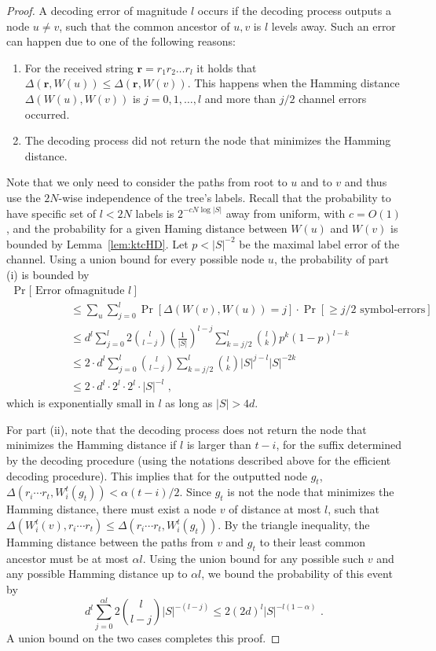 \documentclass[ letterpaper, 11pt]{article}
\begin{document}
\begin{proof}
A decoding error of magnitude $l$ occurs if the decoding process outputs a node
 $u\ne v$, such that the common ancestor of $u,v$ is $l$ levels away.
Such an error can happen due to one of the following reasons:
\begin{enumerate}
\renewcommand{\labelenumi}{(\roman{enumi})}
\setlength{\itemsep}{1pt}
\vspace{-0.3em}
\item For the received string ${\mathbf r}=r_1r_2 \ldots r_l$ it holds that
$\Delta({\mathbf r}, W(u)) \le \Delta({\mathbf r}, W(v))$. This happens when
the Hamming distance $\Delta(W(u),W(v))$ is $j=0,1,\ldots,l$ and more than $j/2$ channel errors  occurred.
\item The decoding process did not return the node that minimizes the Hamming distance.
\end{enumerate}
Note that we only need to consider the paths from root to $u$ and to $v$ and thus use the $2N$-wise independence of the tree's labels.
Recall that the probability to have specific set of $l<2N$ labels is $2^{-cN\log|S|}$ away from uniform, with $c=O(1)$, and the probability for a given Haming distance between $W(u)$ and $W(v)$ is bounded by Lemma~\ref{lem:ktcHD}.
Let $p < |S|^{-2}$ be the maximal label error of the channel.
Using a union bound for every possible node $u$,
the probability of part (i) is bounded by
\begin{align*}
\Pr[ \text{ Error of}&\text{ magnitude } l\ ]  \\ &
\le  \sum_u\sum_{j=0}^l \Pr [\Delta (W(v),W(u)) = j  ] \cdot  \Pr [\ge j/2 \text{ symbol-errors}] \\
& \le d^l \sum_{j=0}^{l}  2{l \choose l-j} \left(\frac{1}{|S|}\right)^{l-j}
   \sum_{k=j/2}^l {l \choose k} p^k (1-p)^{l-k} \\
& \le 2\cdot d^l \sum_{j=0}^{l}  {l \choose l-j} \sum_{k=j/2}^l {l \choose k} {|S|}^{j-l} |S|^{-2k} \\ &
  \le 2\cdot d^l  \cdot 2^l\cdot 2^l\cdot |S|^{-l}\text{ ,}
\end{align*}
which is exponentially small in $l$ as long as $|S|>4d$.


For part (ii),
note that the decoding process does not return the node that minimizes the Hamming
distance if
$l$ is larger than $t-i$, for the suffix determined by the decoding procedure
(using the notations described above for the efficient decoding procedure).
This implies that for the outputted node $g_t$, $\Delta(r_i\cdots r_t,W_i^{t}(g_t)) < \alpha(t-i)/2$.
Since $g_t$ is not the node that minimizes the Hamming distance,
there must exist a node $v$
of distance at most $l$,
such that $\Delta(W_i^t(v), r_i\cdots r_t) \le  \Delta(r_i\cdots r_t,W_i^{t}(g_t))$.
By the triangle inequality, the Hamming distance between the paths from
 $v$ and $g_t$  to
 their least common ancestor
must be at most $\alpha l$.
Using the union bound for any possible such $v$ and any possible Hamming distance up to $\alpha l$,
we bound the probability of this event by
$$d^l\sum_{j=0}^{\alpha l}2{l \choose l-j}|S|^{-(l-j)}\le 2(2d)^l |S|^{-l(1-\alpha)}\text{ .}$$
A union bound on the two cases completes this proof.
\end{proof}
\end{document}
